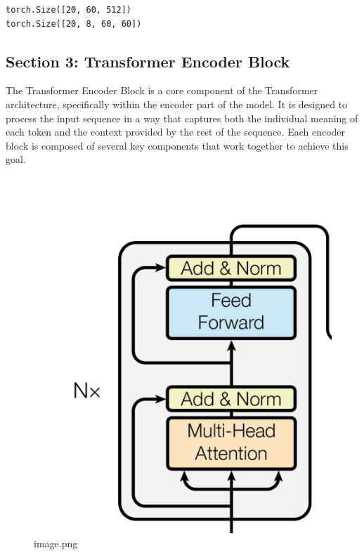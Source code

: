 \documentclass[11pt]{article}
\begin{document}
    \begin{Verbatim}[commandchars=\\\{\}]
torch.Size([20, 60, 512])
torch.Size([20, 8, 60, 60])
    \end{Verbatim}

    \subsection{Section 3: Transformer Encoder
Block}\label{section-3-transformer-encoder-block}

    The Transformer Encoder Block is a core component of the Transformer
architecture, specifically within the encoder part of the model. It is
designed to process the input sequence in a way that captures both the
individual meaning of each token and the context provided by the rest of
the sequence. Each encoder block is composed of several key components
that work together to achieve this goal.

\begin{figure}
\centering
\includegraphics{image.png}
\caption{image.png}
\end{figure}
\end{document}
